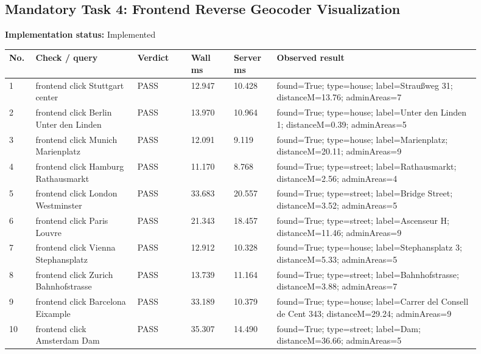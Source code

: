 \documentclass[10pt,a4paper]{article}
\begin{document}
\subsection{Mandatory Task 4: Frontend Reverse Geocoder Visualization}
\textbf{Implementation status:} Implemented\\
\scriptsize
\begin{longtable}{|P{0.045\linewidth}|P{0.19\linewidth}|P{0.105\linewidth}|P{0.085\linewidth}|P{0.085\linewidth}|P{0.385\linewidth}|}
\hline
\textbf{No.} & \textbf{Check / query} & \textbf{Verdict} & \textbf{Wall ms} & \textbf{Server ms} & \textbf{Observed result}\\ \hline
{} 1 & frontend click Stuttgart center & PASS & 12.947 & 10.428 & found=True; type=house; label=Straußweg 31; distanceM=13.76; adminAreas=7\\ \hline
{} 2 & frontend click Berlin Unter den Linden & PASS & 13.970 & 10.964 & found=True; type=house; label=Unter den Linden 1; distanceM=0.39; adminAreas=5\\ \hline
{} 3 & frontend click Munich Marienplatz & PASS & 12.091 & 9.119 & found=True; type=house; label=Marienplatz; distanceM=20.11; adminAreas=9\\ \hline
{} 4 & frontend click Hamburg Rathausmarkt & PASS & 11.170 & 8.768 & found=True; type=street; label=Rathausmarkt; distanceM=2.56; adminAreas=4\\ \hline
{} 5 & frontend click London Westminster & PASS & 33.683 & 20.557 & found=True; type=street; label=Bridge Street; distanceM=3.52; adminAreas=5\\ \hline
{} 6 & frontend click Paris Louvre & PASS & 21.343 & 18.457 & found=True; type=street; label=Ascenseur H; distanceM=11.46; adminAreas=9\\ \hline
{} 7 & frontend click Vienna Stephansplatz & PASS & 12.912 & 10.328 & found=True; type=house; label=Stephansplatz 3; distanceM=5.33; adminAreas=5\\ \hline
{} 8 & frontend click Zurich Bahnhofstrasse & PASS & 13.739 & 11.164 & found=True; type=street; label=Bahnhofstrasse; distanceM=3.88; adminAreas=7\\ \hline
{} 9 & frontend click Barcelona Eixample & PASS & 33.189 & 10.379 & found=True; type=house; label=Carrer del Consell de Cent 343; distanceM=29.24; adminAreas=9\\ \hline
{} 10 & frontend click Amsterdam Dam & PASS & 35.307 & 14.490 & found=True; type=street; label=Dam; distanceM=36.66; adminAreas=5\\ \hline
\end{longtable}
\normalsize
\end{document}
